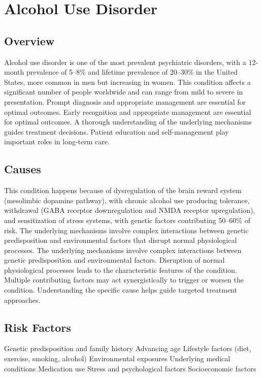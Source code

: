 \chapter{Alcohol Use Disorder}
\label{sec:Alcohol Use Disorder}

\section{Overview}
Alcohol use disorder is one of the most prevalent psychiatric disorders, with a 12-month prevalence of 5--8\% and lifetime prevalence of 20--30\% in the United States, more common in men but increasing in women. This condition affects a significant number of people worldwide and can range from mild to severe in presentation. Prompt diagnosis and appropriate management are essential for optimal outcomes. Early recognition and appropriate management are essential for optimal outcomes. A thorough understanding of the underlying mechanisms guides treatment decisions. Patient education and self-management play important roles in long-term care.
\section{Causes}
This condition happens because of dysregulation of the brain reward system (mesolimbic dopamine pathway), with chronic alcohol use producing tolerance, withdrawal (GABA receptor downregulation and NMDA receptor upregulation), and sensitization of stress systems, with genetic factors contributing 50--60\% of risk. The underlying mechanisms involve complex interactions between genetic predisposition and environmental factors that disrupt normal physiological processes. The underlying mechanisms involve complex interactions between genetic predisposition and environmental factors. Disruption of normal physiological processes leads to the characteristic features of the condition. Multiple contributing factors may act synergistically to trigger or worsen the condition. Understanding the specific cause helps guide targeted treatment approaches.
\section{Risk Factors}
Genetic predisposition and family history Advancing age Lifestyle factors (diet, exercise, smoking, alcohol) Environmental exposures Underlying medical conditions Medication use Stress and psychological factors Socioeconomic factors

